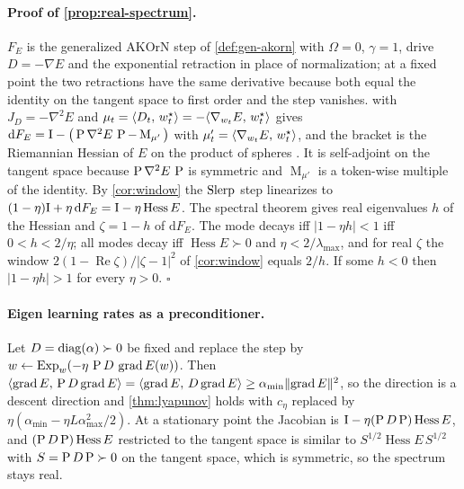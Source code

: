 \paragraph{Proof of \cref{prop:real-spectrum}.}
$F_E$ is the generalized AKOrN step of \cref{def:gen-akorn} with $\Omega=0$, $\gamma=1$, drive
$D=-\nabla E$ and the exponential retraction in place of normalization; at a fixed point the two
retractions have the same derivative because both equal the identity on the tangent space to first
order and the step vanishes.  with $J_D=-\nabla^2E$ and
$\mu_t=\langle D_t,\, w^\star_t\rangle=-\langle \nabla_{w_t}E,\, w^\star_t\rangle$ gives
$\mathrm dF_E=\mathrm{I}-\big(\operatorname{P}\nabla^2E\,\operatorname{P}-\operatorname{M}_{\mu'}\big)$ with
$\mu'_t=\langle \nabla_{w_t}E,\, w^\star_t\rangle$, and the bracket is the Riemannian Hessian of $E$ on the
product of spheres \citep[Sec.~5.4]{absil2008}. It is self-adjoint on the tangent space because
$\operatorname{P}\nabla^2E\,\operatorname{P}$ is symmetric and $\operatorname{M}_{\mu'}$ is a token-wise multiple of the
identity. By \cref{cor:window} the $\operatorname{Slerp}$ step linearizes to $(1-\eta)\mathrm{I}+\eta\,\mathrm dF_E=\mathrm{I}-\eta\operatorname{Hess}E$.
The spectral theorem gives real eigenvalues $h$ of the Hessian and $\zeta=1-h$ of $\mathrm dF_E$. The
mode decays iff $|1-\eta h|<1$ iff $0<h<2/\eta$; all modes decay iff $\operatorname{Hess}E\succ0$ and
$\eta<2/\lambda_{\max}$, and for real $\zeta$ the window $2(1-\operatorname{Re}\zeta)/|\zeta-1|^2$
of \cref{cor:window} equals $2/h$. If some $h<0$ then $|1-\eta h|>1$ for every $\eta>0$. \hfill$\square$

\paragraph{Eigen learning rates as a preconditioner.}
Let $D=\operatorname{diag}(\alpha)\succ0$ be fixed and replace the step by $w\leftarrow\operatorname{Exp}_w(-\eta\,\operatorname{P} D\,\operatorname{grad} E(w))$.
Then $\langle \operatorname{grad} E,\, \operatorname{P} D\operatorname{grad} E\rangle=\langle \operatorname{grad} E,\, D\operatorname{grad} E\rangle\ge\alpha_{\min}\lVert \operatorname{grad} E\rVert^2$, so the
direction is a descent direction and \cref{thm:lyapunov} holds with $c_\eta$ replaced by
$\eta(\alpha_{\min}-\eta L\alpha_{\max}^2/2)$. At a stationary point the Jacobian is
$\mathrm{I}-\eta(\operatorname{P} D\operatorname{P})\operatorname{Hess}E$, and $(\operatorname{P} D\operatorname{P})\operatorname{Hess}E$ restricted to
the tangent space is similar to $S^{1/2}\operatorname{Hess}E\,S^{1/2}$ with $S=\operatorname{P} D\operatorname{P}\succ0$ on
the tangent space, which is symmetric, so the spectrum stays real.

